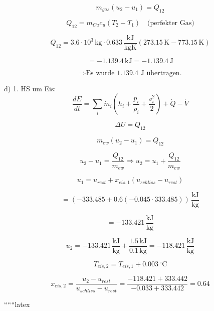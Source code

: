 \begin{equation}
m_{gas} (u_2 - u_1) = Q_{12}
\end{equation}

\begin{equation}
Q_{12} = m_{Cu} c_{u} (T_2 - T_1) \quad \text{(perfekter Gas)}
\end{equation}

\begin{equation}
Q_{12} = 3.6 \cdot 10^3 \, \text{kg} \cdot 0.633 \, \frac{\text{kJ}}{\text{kgK}} (273.15 \, \text{K} - 773.15 \, \text{K})
\end{equation}

\begin{equation}
= -1.139.4 \, \text{kJ} = -1.139.4 \, \text{J}
\end{equation}

\begin{equation}
\Rightarrow \text{Es wurde 1.139.4 J übertragen.}
\end{equation}

d) 1. HS um Eis:
\begin{equation}
\frac{dE}{dt} = \sum_i \dot{m}_i (h_i + \frac{p_i}{\rho_i} + \frac{v_i^2}{2}) + \dot{Q} - \dot{V}
\end{equation}

\begin{equation}
\Delta U = Q_{12}
\end{equation}

\begin{equation}
m_{ew} (u_2 - u_1) = Q_{12}
\end{equation}

\begin{equation}
u_2 - u_1 = \frac{Q_{12}}{m_{ew}} \Rightarrow u_2 = u_1 + \frac{Q_{12}}{m_{ew}}
\end{equation}

\begin{equation}
u_1 = u_{rest} + x_{eis,1} (u_{schliss} - u_{rest})
\end{equation}

\begin{equation}
= (-333.485 + 0.6 (-0.045 \cdot 333.485)) \, \frac{\text{kJ}}{\text{kg}}
\end{equation}

\begin{equation}
= -133.421 \, \frac{\text{kJ}}{\text{kg}}
\end{equation}

\begin{equation}
u_2 = -133.421 \, \frac{\text{kJ}}{\text{kg}} + \frac{1.5 \, \text{kJ}}{0.1 \, \text{kg}} = -118.421 \, \frac{\text{kJ}}{\text{kg}}
\end{equation}

\begin{equation}
T_{eis,2} = T_{eis,1} + 0.003 \, ^\circ \text{C}
\end{equation}

\begin{equation}
x_{eis,2} = \frac{u_2 - u_{rest}}{u_{schliss} - u_{rest}} = \frac{-118.421 + 333.442}{-0.033 + 333.442} = 0.64
\end{equation}

``````latex



